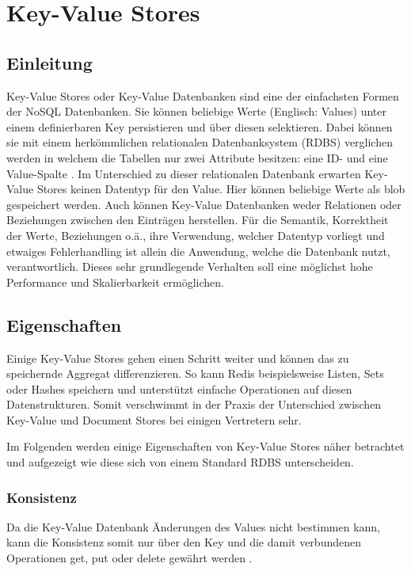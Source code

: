 \section{Key-Value Stores}
\subsection{Einleitung}
Key-Value Stores oder Key-Value Datenbanken sind eine der einfachsten Formen der NoSQL Datenbanken. Sie können beliebige Werte (Englisch: Values) unter einem definierbaren Key persistieren und über diesen selektieren. Dabei können sie mit einem herkömmlichen relationalen Datenbanksystem (RDBS) verglichen werden in welchem die Tabellen nur zwei Attribute besitzen: eine ID- und eine Value-Spalte \cite{sadalage01}. Im Unterschied zu dieser relationalen Datenbank erwarten Key-Value Stores keinen Datentyp für den Value. Hier können beliebige Werte als blob gespeichert werden. Auch können Key-Value Datenbanken weder Relationen oder Beziehungen zwischen den Einträgen herstellen. Für die Semantik, Korrektheit der Werte, Beziehungen o.ä., ihre Verwendung, welcher Datentyp vorliegt und etwaiges Fehlerhandling ist allein die Anwendung, welche die Datenbank nutzt, verantwortlich. Dieses sehr grundlegende Verhalten soll eine möglichst hohe Performance und Skalierbarkeit ermöglichen. 

\subsection{Eigenschaften}
Einige Key-Value Stores gehen einen Schritt weiter und können das zu speichernde Aggregat differenzieren. So kann Redis beispielsweise Listen, Sets oder Hashes speichern und unterstützt einfache Operationen auf diesen Datenstrukturen. Somit verschwimmt in der Praxis der Unterschied zwischen Key-Value und Document Stores bei einigen Vertretern sehr.

Im Folgenden werden einige Eigenschaften von Key-Value Stores näher betrachtet und aufgezeigt wie diese sich von einem Standard RDBS unterscheiden.

\subsubsection{Konsistenz}
Da die Key-Value Datenbank Änderungen des Values nicht bestimmen kann, kann die Konsistenz somit nur über den Key und die damit verbundenen Operationen get, put oder delete gewährt werden \cite{sadalage01}. 

